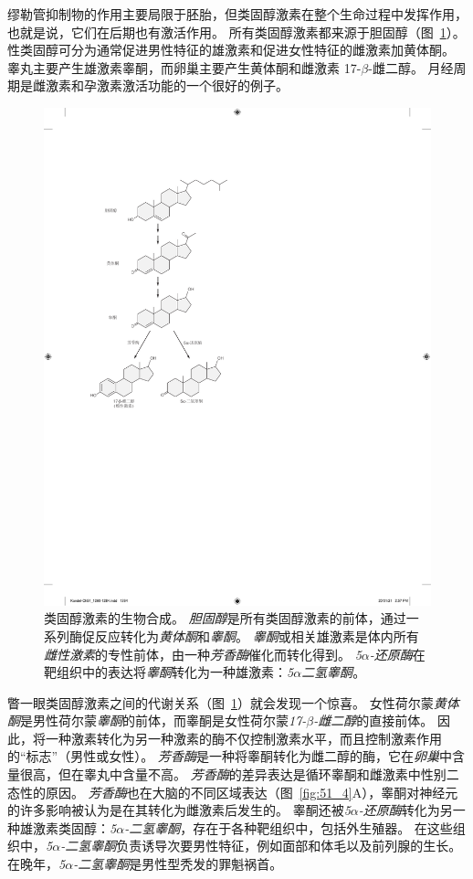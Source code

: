 缪勒管抑制物的作用主要局限于胚胎，但类固醇激素在整个生命过程中发挥作用，也就是说，它们在后期也有激活作用。 
所有类固醇激素都来源于胆固醇（图~\ref{fig:51_3}）。
性类固醇可分为通常促进男性特征的雄激素和促进女性特征的雌激素加黄体酮。
睾丸主要产生雄激素睾酮，而卵巢主要产生黄体酮和雌激素 17-$ \beta $-雌二醇。
月经周期是雌激素和孕激素激活功能的一个很好的例子。


\begin{figure}[htbp]
	\centering
	\includegraphics[width=0.64\linewidth]{chap51/fig_51_3}
	\caption{类固醇激素的生物合成。
		\textit{胆固醇}是所有类固醇激素的前体，通过一系列酶促反应转化为\textit{黄体酮}和\textit{睾酮}。
		\textit{睾酮}或相关雄激素是体内所有\textit{雌性激素}的专性前体，由一种\textit{芳香酶}催化而转化得到。
		\textit{5$\alpha$-还原酶}在靶组织中的表达将\textit{睾酮}转化为一种雄激素：\textit{5$ \alpha $二氢睾酮}。}
	\label{fig:51_3}
\end{figure}


瞥一眼类固醇激素之间的代谢关系（图~\ref{fig:51_3}）就会发现一个惊喜。
女性荷尔蒙\textit{黄体酮}是男性荷尔蒙\textit{睾酮}的前体，而睾酮是女性荷尔蒙\textit{17-$ \beta $-雌二醇}的直接前体。
因此，将一种激素转化为另一种激素的酶不仅控制激素水平，而且控制激素作用的“标志”（男性或女性）。
\textit{芳香酶}是一种将睾酮转化为雌二醇的酶，它在\textit{卵巢}中含量很高，但在睾丸中含量不高。
\textit{芳香酶}的差异表达是循环睾酮和雌激素中性别二态性的原因。
\textit{芳香酶}也在大脑的不同区域表达（图~\ref{fig:51_4}A），睾酮对神经元的许多影响被认为是在其转化为雌激素后发生的。
睾酮还被\textit{5$\alpha$-还原酶}转化为另一种雄激素类固醇：\textit{5$\alpha$-二氢睾酮}，存在于各种靶组织中，包括外生殖器。
在这些组织中，\textit{5$\alpha$-二氢睾酮}负责诱导次要男性特征，例如面部和体毛以及前列腺的生长。
在晚年，\textit{5$\alpha$-二氢睾酮}是男性型秃发的罪魁祸首。


